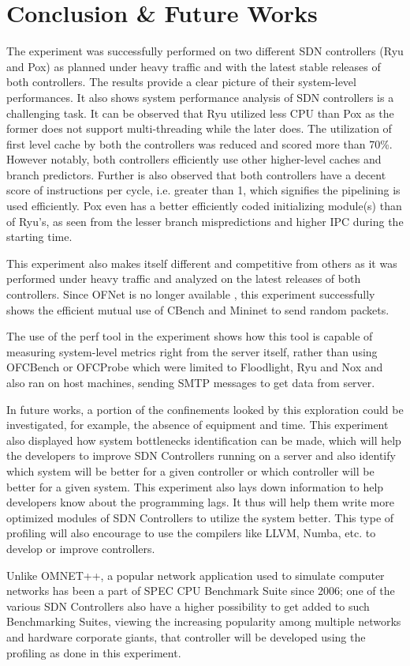 \chapter{Conclusion \& Future Works} 

The experiment was successfully performed on two different SDN controllers (Ryu and Pox) as planned under heavy traffic and with the latest stable releases of both controllers. The results provide a clear picture of their system-level performances. It also shows system performance analysis of SDN controllers is a challenging task.  It can be observed that Ryu utilized less CPU than Pox as the former does not support multi-threading while the later does. The utilization of first level cache by both the controllers was reduced and scored more than 70\%. However notably, both controllers efficiently use other higher-level caches and branch predictors. Further is also observed that both controllers have a decent score of instructions per cycle, i.e. greater than 1, which signifies the pipelining is used efficiently. Pox even has a better efficiently coded initializing module(s) than of Ryu's, as seen from the lesser branch mispredictions and higher IPC during the starting time.

This experiment also makes itself different and competitive from others as it was performed under heavy traffic and analyzed on the latest releases of both controllers. Since OFNet is no longer available \cite{}, this experiment successfully shows the efficient mutual use of CBench and Mininet to send random packets.

The use of the perf tool in the experiment shows how this tool is capable of measuring system-level metrics right from the server itself, rather than using OFCBench or OFCProbe which were limited to Floodlight, Ryu and Nox and also ran on host machines, sending SMTP messages to get data from server.

In future works, a portion of the confinements looked by this exploration could be investigated, for example, the absence of equipment and time. This experiment also displayed how system bottlenecks identification can be made, which will help the developers to improve SDN Controllers running on a server and also identify which system will be better for a given controller or which controller will be better for a given system. This experiment also lays down information to help developers know about the programming lags. It thus will help them write more optimized modules of SDN Controllers to utilize the system better. This type of profiling will also encourage to use the compilers like LLVM, Numba, etc. to develop or improve controllers.

Unlike OMNET++, a popular network application used to simulate computer networks has been a part of SPEC CPU Benchmark Suite since 2006; one of the various SDN Controllers also have a higher possibility to get added to such Benchmarking Suites, viewing the increasing popularity among multiple networks and hardware corporate giants, that controller will be developed using the profiling as done in this experiment.